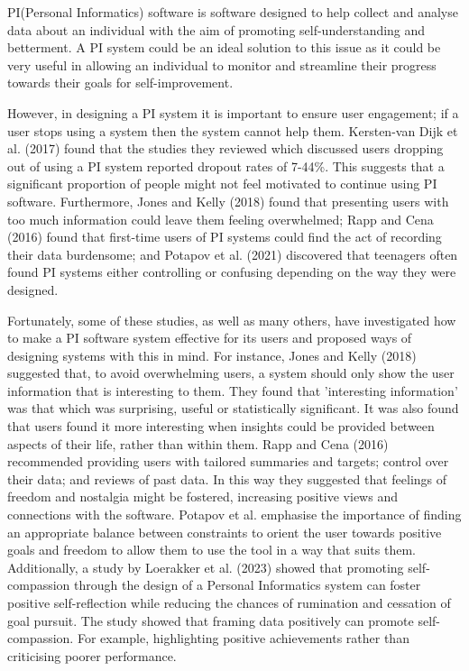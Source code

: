 \documentclass[11pt]{article}
\begin{document}
PI(Personal Informatics) software is software designed to help collect and
analyse data about an individual with the aim of promoting self-understanding
and betterment. A PI system could be an ideal solution to this issue as it
could be very useful in allowing an individual to monitor and streamline their
progress towards their goals for self-improvement.\par

However, in designing a PI system it is important to ensure user engagement; if
a user stops using a system then the system cannot help them. Kersten-van Dijk
et al. (2017) found that the studies they reviewed which discussed users
dropping out of using a PI system reported dropout rates of 7-44\%. This
suggests that a significant proportion of people might not feel motivated to
continue using PI software. Furthermore, Jones and Kelly (2018) found that
presenting users with too much information could leave them feeling
overwhelmed; Rapp and Cena (2016) found that first-time users of PI systems
could find the act of recording their data burdensome; and Potapov et al.
(2021) discovered that teenagers often found PI systems either controlling or
confusing depending on the way they were designed.\par

Fortunately, some of these studies, as well as many others, have investigated
how to make a PI software system effective for its users and proposed ways of
designing systems with this in mind. For instance, Jones and Kelly (2018)
suggested that, to avoid overwhelming users, a system should only show the user
information that is interesting to them. They found that 'interesting
information' was that which was surprising, useful or statistically
significant. It was also found that users found it more interesting when
insights could be provided between aspects of their life, rather than within
them. Rapp and Cena (2016) recommended providing users with tailored summaries
and targets; control over their data; and reviews of past data. In this way
they suggested that feelings of freedom and nostalgia might be fostered,
increasing positive views and connections with the software. Potapov et al.
emphasise the importance of finding an appropriate balance between constraints
to orient the user towards positive goals and freedom to allow them to use the
tool in a way that suits them. Additionally, a study by Loerakker et al. (2023)
showed that promoting self-compassion through the design of a Personal
Informatics system can foster positive self-reflection while reducing the
chances of rumination and cessation of goal pursuit. The study showed that
framing data positively can promote self-compassion. For example, highlighting
positive achievements rather than criticising poorer performance.\par
\end{document}
